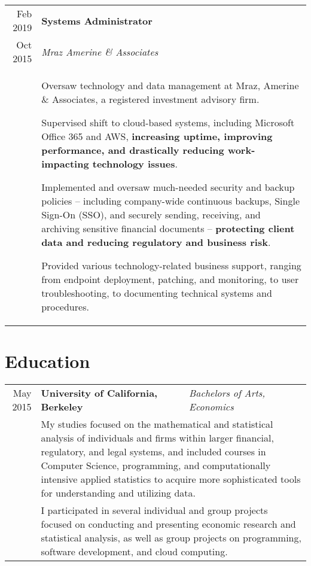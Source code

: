 \documentclass[10pt]{article}
\newcommand{\afterlistspace}[0]{\vspace{-1.5em}}
\begin{document}
\begin{tabular}{r|p{16cm}}
    Feb 2019 & \textbf{Systems Administrator}
    \\
    Oct 2015 & \emph{Mraz Amerine \& Associates}
    \\
    & \begin{itemize}
        \footnotesize{
            \item Oversaw technology and data management at Mraz, Amerine \& Associates, a registered investment advisory firm.
            
            \item Supervised shift to cloud-based systems, including Microsoft Office 365 and AWS, \textbf{increasing uptime, improving performance, and drastically reducing work-impacting technology issues}.
            
            \item Implemented and oversaw much-needed security and backup policies -- including company-wide continuous backups, Single Sign-On (SSO), and securely sending, receiving, and archiving sensitive financial documents -- \textbf{protecting client data and reducing regulatory and business risk}.

            \item Provided various technology-related business support, ranging from endpoint deployment, patching, and monitoring, to user troubleshooting, to documenting technical systems and procedures.
        }

        \afterlistspace
    \end{itemize}

\end{tabular}


\section{Education}

\begin{tabular}{r|l|p{16cm}}
    May 2015 & \textbf{University of California, Berkeley} & \emph{Bachelors of Arts, Economics}
    \\
    & \multicolumn{2}{p{16cm}}{\footnotesize{My studies focused on the mathematical and statistical analysis of individuals and firms within larger financial, regulatory, and legal systems, and included courses in Computer Science, programming, and computationally intensive applied statistics to acquire more sophisticated tools for understanding and utilizing data.}}
    \\
    & \multicolumn{2}{p{16cm}}{\footnotesize{I participated in several individual and group projects focused on conducting and presenting economic research and statistical analysis, as well as group projects on programming, software development, and cloud computing.}}
\end{tabular}
\end{document}
